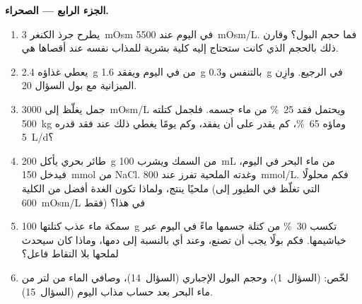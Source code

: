 \begin{problem}
\medskip
\noindent\textbf{الجزء الرابع --- الصحراء.}
\begin{enumerate}[resume]
  \item يطرح جرذ الكنغر \qty{3}{mOsm} في اليوم عند \qty{5500}{mOsm/L}.
        فما حجم البول؟ وقارن ذلك بالحجم الذي كانت ستحتاج إليه
        كلية بشرية للمذاب نفسه عند أقصاها هي.
  \item يعطي غذاؤه \qty{2.4}{g} من  في اليوم
        ويفقد \qty{1.6}{g} بالتنفس و\qty{0.3}{g} في الرجيع.
        وازِن الميزانية مع بول السؤال 20.
  \item جمل يغلّظ إلى \qty{3000}{mOsm/L} ويحتمل فقد \qty{25}{\%}
        من ماء جسمه. فلجمل كتلته \qty{500}{kg} وماؤه
        \qty{65}{\%}، كم يقدر على أن يفقد، وكم يومًا يغطي ذلك
        عند فقد قدره \qty{5}{L/d}؟
  \item طائر بحري يأكل \qty{200}{g} من السمك ويشرب \qty{100}{mL}
        من ماء البحر في اليوم، فيدخل \qty{150}{mmol} من NaCl.
        وغدته الملحية تفرز عند \qty{800}{mmol/L}. فكم محلولًا
        ملحيًا ينتج، ولماذا تكون الغدة أفضل من الكلية (التي
        تغلّظ في الطيور إلى \qty{600}{mOsm/L} فقط) في هذا؟
  \item سمكة ماء عذب كتلتها \qty{100}{g} تكسب \qty{30}{\%} من
        كتلة جسمها ماءً في اليوم عبر خياشيمها. فكم بولًا يجب أن
        تصنع، وعند أي  بالنسبة إلى دمها، وماذا كان
        سيحدث لملحها بلا التقاط فاعل؟
  \item لخّص:  (السؤال~1)، وحجم البول
        الإجباري (السؤال~14)، وصافي الماء من لتر من ماء البحر
        بعد حساب مذاب اليوم (السؤال~15).
\end{enumerate}
\end{problem}
